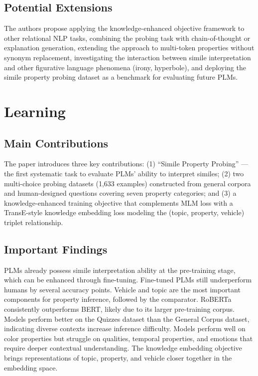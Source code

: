 \documentclass[12pt]{article}
\begin{document}
\subsection{Potential Extensions}

The authors propose applying the knowledge-enhanced objective framework to other relational NLP tasks, combining the probing task with chain-of-thought or explanation generation, extending the approach to multi-token properties without synonym replacement, investigating the interaction between simile interpretation and other figurative language phenomena (irony, hyperbole), and deploying the simile property probing dataset as a benchmark for evaluating future PLMs.

\section{Learning}

\subsection{Main Contributions}

The paper introduces three key contributions: (1) ``Simile Property Probing'' --- the first systematic task to evaluate PLMs' ability to interpret similes; (2) two multi-choice probing datasets (1,633 examples) constructed from general corpora and human-designed questions covering seven property categories; and (3) a knowledge-enhanced training objective that complements MLM loss with a TransE-style knowledge embedding loss modeling the (topic, property, vehicle) triplet relationship.

\subsection{Important Findings}

PLMs already possess simile interpretation ability at the pre-training stage, which can be enhanced through fine-tuning. Fine-tuned PLMs still underperform humans by several accuracy points. Vehicle and topic are the most important components for property inference, followed by the comparator. RoBERTa consistently outperforms BERT, likely due to its larger pre-training corpus. Models perform better on the Quizzes dataset than the General Corpus dataset, indicating diverse contexts increase inference difficulty. Models perform well on color properties but struggle on qualities, temporal properties, and emotions that require deeper contextual understanding. The knowledge embedding objective brings representations of topic, property, and vehicle closer together in the embedding space.
\end{document}

